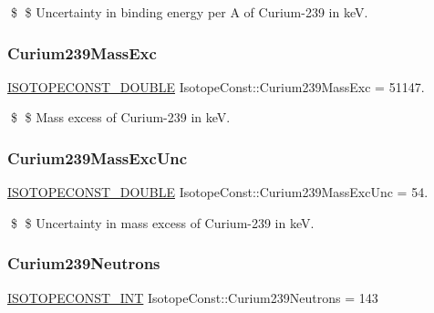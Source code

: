 \$ \$ Uncertainty in binding energy per A of Curium-\/239 in keV. \mbox{\label{group___isotope_const-_curium-_cm239_gad31a4579e486348872be9a7c6dd2fc46}} 
\subsubsection{\texorpdfstring{Curium239\+Mass\+Exc}{Curium239MassExc}}
{\footnotesize\ttfamily \mbox{\hyperlink{group___isotope_const-_macros_ga8f45a7272ce02c0b4c65c44636ed719a}{I\+S\+O\+T\+O\+P\+E\+C\+O\+N\+S\+T\+\_\+\+D\+O\+U\+B\+LE}} Isotope\+Const\+::\+Curium239\+Mass\+Exc = 51147.}

\$ \$ Mass excess of Curium-\/239 in keV. \mbox{\label{group___isotope_const-_curium-_cm239_ga78b1a88b197b8cea621189063066bd16}} 
\subsubsection{\texorpdfstring{Curium239\+Mass\+Exc\+Unc}{Curium239MassExcUnc}}
{\footnotesize\ttfamily \mbox{\hyperlink{group___isotope_const-_macros_ga8f45a7272ce02c0b4c65c44636ed719a}{I\+S\+O\+T\+O\+P\+E\+C\+O\+N\+S\+T\+\_\+\+D\+O\+U\+B\+LE}} Isotope\+Const\+::\+Curium239\+Mass\+Exc\+Unc = 54.}

\$ \$ Uncertainty in mass excess of Curium-\/239 in keV. \mbox{\label{group___isotope_const-_curium-_cm239_ga4d16c2e40a65487af7b28052aaa3e91a}} 
\subsubsection{\texorpdfstring{Curium239\+Neutrons}{Curium239Neutrons}}
{\footnotesize\ttfamily \mbox{\hyperlink{group___isotope_const-_macros_ga5f18360b3e99483a35c32d789e62621c}{I\+S\+O\+T\+O\+P\+E\+C\+O\+N\+S\+T\+\_\+\+I\+NT}} Isotope\+Const\+::\+Curium239\+Neutrons = 143}


